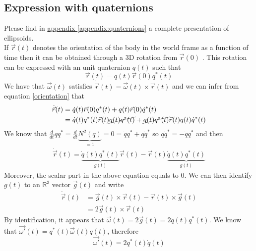 \documentclass[class=report, float=false, crop=false]{standalone}
\begin{document}
\subsection{Expression with quaternions}

Please find in \hyperref[appendix:quaternions]{appendix \ref{appendix:quaternions}} a complete presentation of ellipsoids.\\

If $\vec{r}(t)$ denotes the orientation of the body in the world frame as a function of time then it can be obtained through a 3D rotation from $\vec{r}(0)$ \cite{rapaport1985molecular}. This rotation can be expressed with an unit quaternion $q(t)$ such that
\begin{equation}
\boxed{\vec{r}(t) = q(t)\vec{r}(0)q^*(t)}
\label{orientation}
\end{equation}
We have that $\vec{\omega}(t)$ satisfies $\dot{\vec{r}}(t) = \vec{\omega}(t)\times\vec{r}(t)$ and we can infer from equation \ref{orientation} that
\begin{align*}
\dot{\vec{r}}(t) &= \dot{q}(t)\vec{r}(0)q^*(t) + q(t)\vec{r}(0)\dot{q}^*(t)\\
&= \dot{q}(t)q^*(t)\vec{r}(t)\cancel{q(t)q^*(t)} + \cancel{q(t)q^*(t)}\vec{r}(t)q(t)\dot{q}^*(t)
\end{align*}
We know that $\frac{d}{dt} qq^* = \frac{d}{dt} \underbrace{N^2(q)}_{=1} = 0 = \dot{q}q^* + q\dot{q}^*$ so $q\dot{q}^* = - \dot{q}q^*$ and then
\begin{align*}
\dot{\vec{r}}(t) = \underbrace{\dot{q}(t)q^*(t)}_{g(t)}\vec{r}(t) - \vec{r}(t)\underbrace{\dot{q}(t)q^*(t)}_{g(t)}
\end{align*}
Moreover, the scalar part in the above equation equals to 0. We can then identify $g(t)$ to an $\mathbb{R}^3$ vector $\vec{g}(t)$ and write
\begin{align*}
\dot{\vec{r}}(t) &= \vec{g}(t)\times\vec{r}(t) - \vec{r}(t)\times\vec{g}(t)\\
&= 2\vec{g}(t)\times\vec{r}(t)
\end{align*}
By identification, it appears that $\vec{\omega}(t) = 2\vec{g}(t) = 2\dot{q}(t)q^*(t)$. We know that $\vec{\omega'}(t) = q^*(t)\vec{\omega}(t)q(t)$, therefore
\begin{equation}
\boxed{\vec{\omega'}(t) = 2q^*(t)\dot{q}(t)}
\label{omega}
\end{equation}
\end{document}
